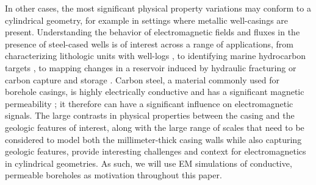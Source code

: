 In other cases, the most significant physical property variations may conform to a cylindrical geometry, for example in settings where metallic well-casings are present. Understanding the behavior of electromagnetic fields and fluxes in the presence of steel-cased wells is of interest across a range of applications, from characterizing lithologic units with well-logs \citep{Kaufman1990, Kaufman1993, Augustin1989}, to identifying marine hydrocarbon targets \citep{Kong2009, Swidinsky2013, Tietze2015}, to mapping changes in a reservoir induced by hydraulic fracturing or carbon capture and storage \citep{Pardo2013, Borner2015, Weiss2016, Um2015, hoversten2017borehole, Zhang2018}. Carbon steel, a material commonly used for borehole casings, is highly electrically conductive and has a significant magnetic permeability \citep{wuhabashy1994}; it therefore can have a significant influence on electromagnetic signals. The large contrasts in physical properties between the casing and the geologic features of interest, along with the large range of scales that need to be considered to model both the millimeter-thick casing walls while also capturing geologic features, provide interesting challenges and context for electromagnetics in cylindrical geometries. As such, we will use EM simulations of conductive, permeable boreholes as motivation throughout this paper.

